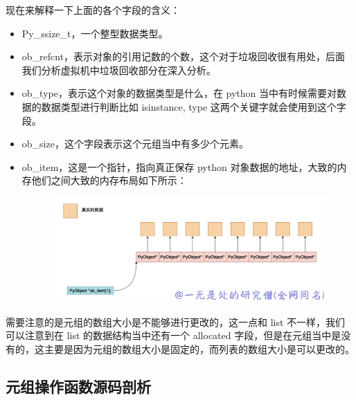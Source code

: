 现在来解释一下上面的各个字段的含义：
\begin{itemize}
\item Py\_ssize\_t，一个整型数据类型。 
\item ob\_refcnt，表示对象的引用记数的个数，这个对于垃圾回收很有用处，后面我们分析虚拟机中垃圾回收部分在深入分析。 
\item ob\_type，表示这个对象的数据类型是什么，在 python 当中有时候需要对数据的数据类型进行判断比如 isinstance, type 这两个关键字就会使用到这个字段。 
\item ob\_size，这个字段表示这个元组当中有多少个元素。 
\item ob\_item，这是一个指针，指向真正保存 python 对象数据的地址，大致的内存他们之间大致的内存布局如下所示： 

    \begin{figure}[h]
        \centering
            \includegraphics[scale=.3]{images/10-tuple.png}
            \caption{ }
        \label{fig:my_label}
    \end{figure}
    
\end{itemize}
需要注意的是元组的数组大小是不能够进行更改的，这一点和 list 不一样，我们可以注意到在 list 的数据结构当中还有一个 allocated 字段，但是在元组当中是没有的，这主要是因为元组的数组大小是固定的，而列表的数组大小是可以更改的。
\subsection{元组操作函数源码剖析}
